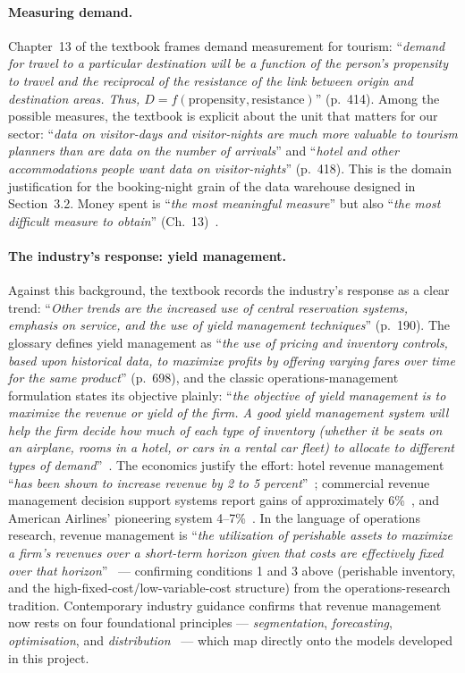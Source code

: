 \paragraph{Measuring demand.}
Chapter~13 of the textbook frames demand measurement for tourism: ``\emph{demand for travel to a particular destination will be a function of the person's propensity to travel and the reciprocal of the resistance of the link between origin and destination areas. Thus, $D = f(\text{propensity}, \text{resistance})$}'' (p.~414). Among the possible measures, the textbook is explicit about the unit that matters for our sector: ``\emph{data on visitor-days and visitor-nights are much more valuable to tourism planners than are data on the number of arrivals}'' and ``\emph{hotel and other accommodations people want data on visitor-nights}'' (p.~418). This is the domain justification for the booking-night grain of the data warehouse designed in Section~3.2. Money spent is ``\emph{the most meaningful measure}'' but also ``\emph{the most difficult measure to obtain}'' (Ch.~13)~\cite{goeldner2009}.

\paragraph{The industry's response: yield management.}
Against this background, the textbook records the industry's response as a clear trend: ``\emph{Other trends are the increased use of central reservation systems, emphasis on service, and the use of yield management techniques}'' (p.~190). The glossary defines yield management as ``\emph{the use of pricing and inventory controls, based upon historical data, to maximize profits by offering varying fares over time for the same product}'' (p.~698), and the classic operations-management formulation states its objective plainly: ``\emph{the objective of yield management is to maximize the revenue or yield of the firm. A good yield management system will help the firm decide how much of each type of inventory (whether it be seats on an airplane, rooms in a hotel, or cars in a rental car fleet) to allocate to different types of demand}''~\cite{kimes1989}. The economics justify the effort: hotel revenue management ``\emph{has been shown to increase revenue by 2 to 5 percent}''~\cite{anderson2012}; commercial revenue management decision support systems report gains of approximately 6\%~\cite{boyd2003}, and American Airlines' pioneering system 4--7\%~\cite{smith1992}. In the language of operations research, revenue management is ``\emph{the utilization of perishable assets to maximize a firm's revenues over a short-term horizon given that costs are effectively fixed over that horizon}''~\cite{mcgill1999} --- confirming conditions 1 and 3 above (perishable inventory, and the high-fixed-cost/low-variable-cost structure) from the operations-research tradition. Contemporary industry guidance confirms that revenue management now rests on four foundational principles --- \emph{segmentation}, \emph{forecasting}, \emph{optimisation}, and \emph{distribution}~\cite{amadeus2023} --- which map directly onto the models developed in this project.
